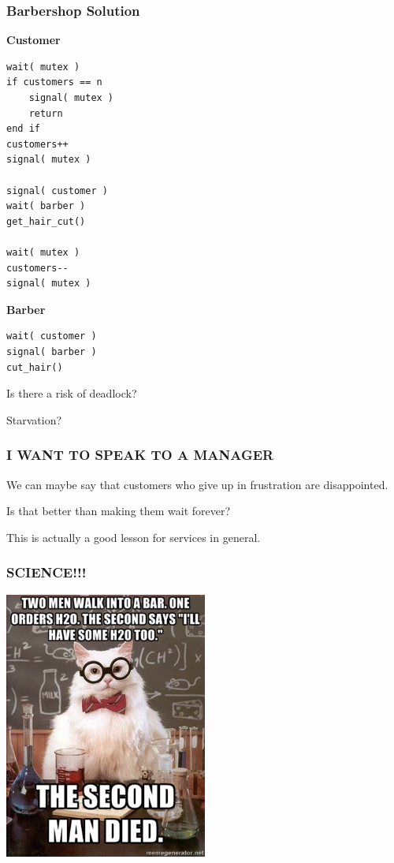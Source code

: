 \begin{frame}[fragile]
	\frametitle{Barbershop Solution}

	\begin{multicols}{2}
		\textbf{Customer}
		\begin{lstlisting}
wait( mutex )
if customers == n
    signal( mutex )
    return
end if
customers++
signal( mutex )

signal( customer )
wait( barber )
get_hair_cut()

wait( mutex )
customers--
signal( mutex )
\end{lstlisting}
		\columnbreak
		\textbf{Barber}
		\begin{lstlisting}
wait( customer )
signal( barber )
cut_hair()
  \end{lstlisting}
	\end{multicols}

	Is there a risk of deadlock?

	Starvation?

\end{frame}


\begin{frame}
	\frametitle{I WANT TO SPEAK TO A MANAGER}

	We can maybe say that customers who give up in frustration are disappointed.

	Is that better than making them wait forever?

	This is actually a good lesson for services in general.

\end{frame}


\begin{frame}
	\frametitle{SCIENCE!!!}

	\begin{center}
		\includegraphics[width=0.5\textwidth]{images/h2o2.jpg}
	\end{center}


\end{frame}

